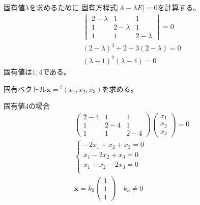 \documentclass[10pt,b5paper]{ltjsarticle}
\begin{document}
\begin{enumerate}
       \dotfill

       固有値$\lambda$を求めるために
       固有方程式$\lvert A-\lambda E \rvert =0$を計算する。
       \begin{align}
        \begin{vmatrix}
         2-\lambda & 1 & 1\\
         1 & 2-\lambda & 1\\
         1 & 1 & 2-\lambda
        \end{vmatrix}
        =0\\
        (2-\lambda)^3+2-3(2-\lambda)=0\\
        (\lambda-1)^2(\lambda-4)=0
       \end{align}
       固有値は$1, 4$である。

       固有ベクトル$\bm{x}={^t(x_1,x_2,x_3)}$を求める。
       
       固有値$4$の場合
       \begin{gather}
        \begin{pmatrix}
         2-4 & 1 & 1\\
         1 & 2-4 & 1\\
         1 & 1 & 2-4
        \end{pmatrix}
        \begin{pmatrix}
         x_1\\x_2\\x_3
        \end{pmatrix}
        =0\\
        \begin{cases}
         -2x_1+x_2+x_3=0\\
         x_1-2x_2+x_3=0\\
         x_1+x_2-2x_3=0\\
        \end{cases}\\
        \bm{x}=k_3\begin{pmatrix}1\\1\\1\end{pmatrix}
        \quad k_3\ne0
       \end{gather}


\end{enumerate}
\end{document}
